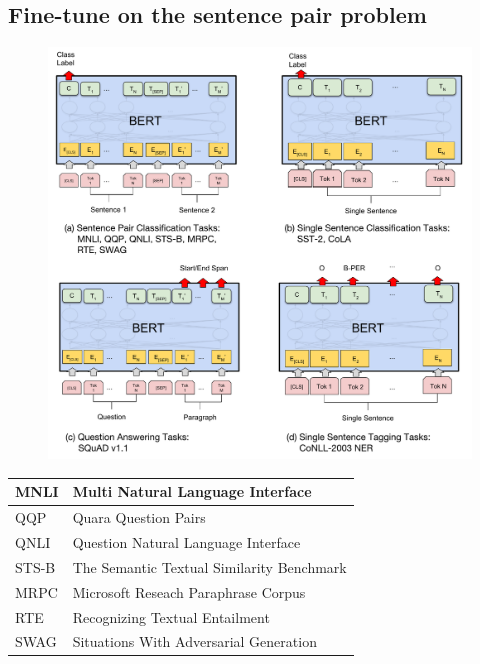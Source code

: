 \documentclass[final,letterpaper,twoside,12pt]{report}
\begin{document}
\newpage

\subsection{Fine-tune on the sentence pair problem}


\begin{figure}[h]
	\begin{center}
		\includegraphics[trim=0 470 440 0, clip,width=1\textwidth]{BERT_fine_tune.pdf}
	\end{center}
\end{figure}

\begin{center}
	\begin{tabular}{|p{2cm}|p{10cm}|}
		\hline
		\color{blue}MNLI  & \color{black}Multi Natural Language Interface           \\
		\hline
		\color{blue}QQP   & \color{black} Quara Question Pairs                      \\
		\hline
		\color{blue}QNLI  & \color{black}Question Natural Language Interface        \\
		\hline
		\color{blue}STS-B & \color{black} The Semantic Textual Similarity Benchmark \\
		\hline
		\color{blue}MRPC  & \color{black} Microsoft Reseach Paraphrase Corpus       \\
		\hline
		\color{blue}RTE   & \color{black} Recognizing Textual Entailment            \\
		\hline
		\color{blue}SWAG  & \color{black} Situations With Adversarial Generation    \\
		\hline
	\end{tabular}
\end{center}
\end{document}
